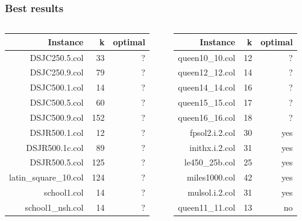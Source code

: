 \documentclass{beamer}
\begin{document}
\begin{frame}
    \frametitle{Best results}


  \begin{columns}
    \begin{column}{0.48\textwidth}
       \begin{table}
   \begin{tabular}{r | r | r |}
       
       Instance & k & optimal \\
       \hline 
       DSJC250.5.col & 33 & ? \\
       DSJC250.9.col & 79 & ? \\
       DSJC500.1.col & 14 & ? \\
       DSJC500.5.col & 60 & ? \\
       DSJC500.9.col & 152 & ? \\
       DSJR500.1.col & 12 & ? \\
       DSJR500.1c.col & 89 & ? \\
       DSJR500.5.col & 125 & ? \\
       latin\_square\_10.col & 124 & ? \\
       school1.col & 14 & ? \\
       school1\_nsh.col & 14 & ? \\
       \hline
   \end{tabular}
     \end{table}
    \end{column}
    \begin{column}{0.48\textwidth}
      \begin{table}
   \begin{tabular}{r | r | r }
       
       Instance & k & optimal \\
       \hline 
       queen10\_10.col & 12 & ? \\
       queen12\_12.col & 14 & ? \\
       queen14\_14.col & 16 & ? \\
       queen15\_15.col & 17 & ? \\
       queen16\_16.col & 18 & ? \\
       fpsol2.i.2.col & 30 & yes \\
       inithx.i.2.col & 31 & yes \\
       le450\_25b.col & 25 & yes \\
       miles1000.col & 42 &  yes \\
       mulsol.i.2.col & 31 & yes \\
       queen11\_11.col & 13 & no \\
       \hline
     \end{tabular}
      
     \end{table}

    \end{column}
\end{columns}
   

\end{frame}
\end{document}
